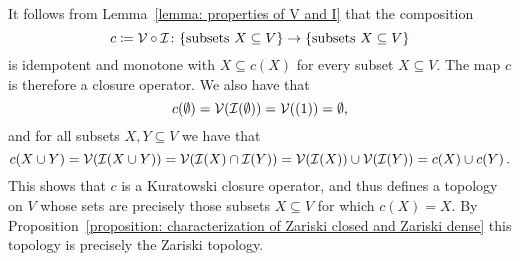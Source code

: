 \begin{remark}
  It follows from Lemma~\ref{lemma: properties of V and I} that the composition
  \[
              c
    \coloneqq  \mathcal{V} \circ \mathcal{I}
    \colon    \{ \text{subsets $X \subseteq V$} \}
    \to       \{ \text{subsets $X \subseteq V$} \}
  \]
  is idempotent and monotone with $X \subseteq c(X)$ for every subset $X \subseteq V$.
  The map $c$ is therefore a closure operator.
  We also have that
  \[
      c(\emptyset)
    = \mathcal{V}(\mathcal{I}(\emptyset))
    = \mathcal{V}((1))
    = \emptyset,
  \]
  and for all subsets $X, Y \subseteq V$ we have that
  \[
      c(X \cup Y)
    = \mathcal{V}(\mathcal{I}(X \cup Y))
    = \mathcal{V}(\mathcal{I}(X) \cap \mathcal{I}(Y))
    = \mathcal{V}(\mathcal{I}(X)) \cup \mathcal{V}(\mathcal{I}(Y))
    = c(X) \cup c(Y) \,.
  \]
  This shows that $c$ is a Kuratowski closure operator, and thus defines a topology on $V$ whose sets are precisely those subsets $X \subseteq V$ for which $c(X) = X$.
  By Proposition~\ref{proposition: characterization of Zariski closed and Zariski dense} this topology is precisely the Zariski topology.
\end{remark}


